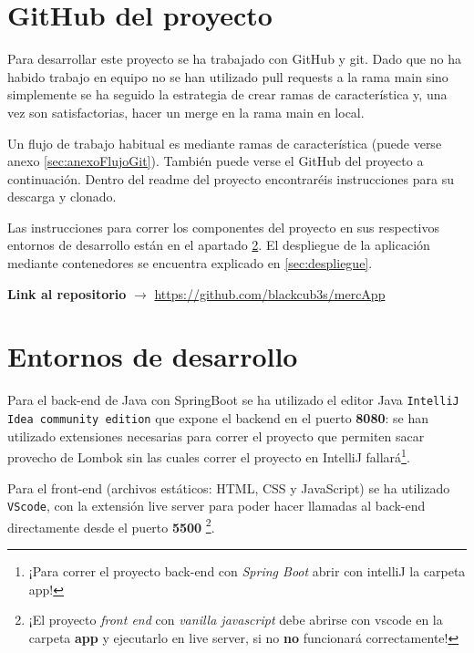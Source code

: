 \documentclass[a4paper,12pt]{report}
\begin{document}
				
			\section{GitHub del proyecto}
			
				Para desarrollar este proyecto se ha trabajado con GitHub y git. Dado que no ha habido trabajo en equipo no se han utilizado pull requests a la rama main sino simplemente se ha seguido la estrategia de crear ramas de característica y, una vez son satisfactorias, hacer un merge en la rama main en local.
				
				Un flujo de trabajo habitual es mediante ramas de característica (puede verse anexo \ref{sec:anexoFlujoGit}). También puede verse el GitHub del proyecto a continuación. Dentro del readme del proyecto encontraréis instrucciones para su descarga y clonado.
				
				Las instrucciones para correr los componentes del proyecto en sus respectivos entornos de desarrollo están en el apartado \ref{sec:entornosDesarrollo}. El despliegue de la aplicación mediante contenedores se encuentra explicado en \ref{sec:despliegue}.
			

			
			
			
			
				\textbf{Link al repositorio} $\rightarrow$ \href{https://github.com/blackcub3s/mercApp}{https://github.com/blackcub3s/mercApp} 
			
	
	
		
			\section{Entornos de desarrollo}
			\label{sec:entornosDesarrollo}
			
				Para el back-end de Java con SpringBoot se ha utilizado el editor Java \texttt{IntelliJ Idea community edition} que expone el backend en el puerto\textbf{ 8080}: se han utilizado extensiones necesarias para correr el proyecto que permiten sacar provecho de Lombok sin las cuales correr el proyecto en IntelliJ fallará\footnote{¡Para correr el proyecto back-end con\textit{ Spring Boot} abrir con intelliJ la carpeta app!}.
				
				Para el front-end (archivos estáticos: HTML, CSS y JavaScript) se ha utilizado \texttt{VScode}, con la extensión live server para poder hacer llamadas al back-end directamente desde el puerto \textbf{5500} \footnote{¡El proyecto \textit{front end} con \textit{vanilla javascript} debe abrirse con vscode en la carpeta \textbf{app} y ejecutarlo en live server, si no \textbf{no} funcionará correctamente!}.
				
\end{document}
